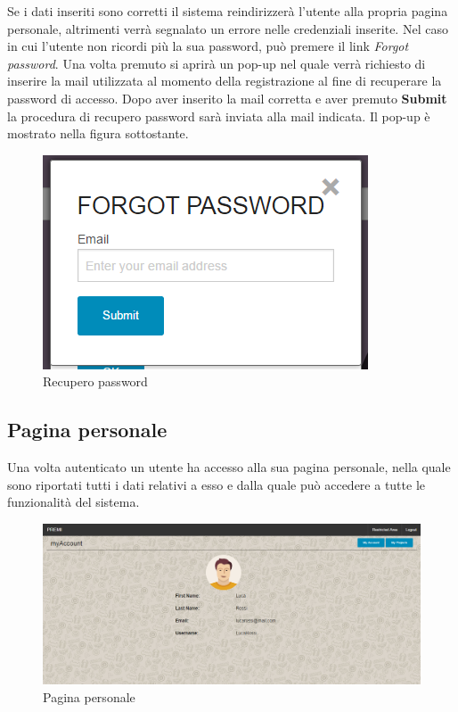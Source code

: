 \noindent Se i dati inseriti sono corretti il sistema reindirizzerà l'utente alla propria pagina personale, altrimenti verrà segnalato un errore nelle credenziali inserite.
\newline
\noindent Nel caso in cui l'utente non ricordi più la sua password, può premere il link \textit{Forgot password}. Una volta premuto si aprirà un pop-up nel quale verrà richiesto di inserire la mail utilizzata al momento della registrazione al fine di recuperare la password di accesso. Dopo aver inserito la mail corretta e aver premuto \textbf{Submit} la procedura di recupero password sarà inviata alla mail indicata. Il pop-up è mostrato nella figura sottostante.

\begin{figure}[H] 
	\centering 
	\includegraphics[scale=0.40] {img/forgot.png}
	\caption{Recupero password} 
\end{figure}

\subsection{Pagina personale}
Una volta autenticato un utente ha accesso alla sua pagina personale, nella quale sono riportati tutti i dati relativi a esso e dalla quale può accedere a tutte le funzionalità del sistema.

\begin{figure}[H] 
	\centering 
	\includegraphics[scale=0.40] {img/myaccount.png}
	\caption{Pagina personale} 
\end{figure}

